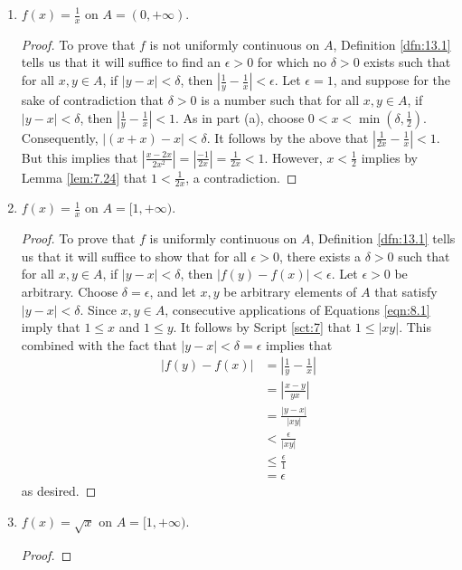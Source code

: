 \documentclass[../main.tex]{subfiles}
\begin{document}
\begin{exercise}
\begin{enumerate}[label={(\alph*)}]
        \item $f(x)=\frac{1}{x}$ on $A=(0,+\infty)$.
        \begin{proof}
            To prove that $f$ is not uniformly continuous on $A$, Definition \ref{dfn:13.1} tells us that it will suffice to find an $\epsilon>0$ for which no $\delta>0$ exists such that for all $x,y\in A$, if $|y-x|<\delta$, then $|\frac{1}{y}-\frac{1}{x}|<\epsilon$. Let $\epsilon=1$, and suppose for the sake of contradiction that $\delta>0$ is a number such that for all $x,y\in A$, if $|y-x|<\delta$, then $|\frac{1}{y}-\frac{1}{x}|<1$. As in part (a), choose $0<x<\min(\delta,\frac{1}{2})$. Consequently, $|(x+x)-x|<\delta$. It follows by the above that $|\frac{1}{2x}-\frac{1}{x}|<1$. But this implies that $|\frac{x-2x}{2x^2}|=|\frac{-1}{2x}|=\frac{1}{2x}<1$. However, $x<\frac{1}{2}$ implies by Lemma \ref{lem:7.24} that $1<\frac{1}{2x}$, a contradiction.
        \end{proof}
        \item $f(x)=\frac{1}{x}$ on $A=[1,+\infty)$.
        \begin{proof}
            To prove that $f$ is uniformly continuous on $A$, Definition \ref{dfn:13.1} tells us that it will suffice to show that for all $\epsilon>0$, there exists a $\delta>0$ such that for all $x,y\in A$, if $|y-x|<\delta$, then $|f(y)-f(x)|<\epsilon$. Let $\epsilon>0$ be arbitrary. Choose $\delta=\epsilon$, and let $x,y$ be arbitrary elements of $A$ that satisfy $|y-x|<\delta$. Since $x,y\in A$, consecutive applications of Equations \ref{eqn:8.1} imply that $1\leq x$ and $1\leq y$. It follows by Script \ref{sct:7} that $1\leq|xy|$. This combined with the fact that $|y-x|<\delta=\epsilon$ implies that
            \begin{align*}
                |f(y)-f(x)| &= \left| \frac{1}{y}-\frac{1}{x} \right|\\
                &= \left| \frac{x-y}{yx} \right|\\
                &= \frac{|y-x|}{|xy|}\\
                &< \frac{\epsilon}{|xy|}\\
                &\leq \frac{\epsilon}{1}\\
                &= \epsilon
            \end{align*}
            as desired.
        \end{proof}
        \item $f(x)=\sqrt{x}$ on $A=[1,+\infty)$.
        \begin{proof}

\end{proof}
\end{enumerate}
\end{exercise}
\end{document}
